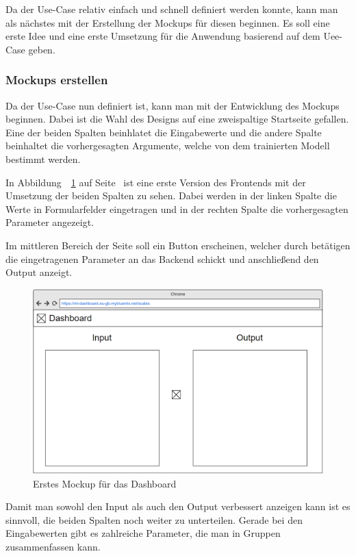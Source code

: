 Da der Use-Case relativ einfach und schnell definiert werden konnte, kann man als nächstes mit der Erstellung der
Mockups für diesen beginnen. Es soll eine erste Idee und eine erste Umsetzung für die Anwendung basierend auf dem
Uee-Case geben.

\subsubsection{Mockups erstellen}
Da der Use-Case nun definiert ist, kann man mit der Entwicklung des Mockups beginnen. Dabei ist die Wahl des
Designs auf eine zweispaltige Startseite gefallen. Eine der beiden Spalten beinhlatet die Eingabewerte und die andere
Spalte beinhaltet die vorhergesagten Argumente, welche von dem trainierten Modell bestimmt werden.

In Abbildung~~\ref{fig:umsetzung_mockup_scale_1} auf Seite~\pageref{fig:umsetzung_mockup_scale_1} ist eine erste Version
des Frontends mit der Umsetzung der beiden Spalten zu sehen. Dabei werden in der linken Spalte die Werte in
Formularfelder eingetragen und in der rechten Spalte die vorhergesagten Parameter angezeigt.

Im mittleren Bereich der Seite soll ein Button erscheinen, welcher durch betätigen die eingetragenen Parameter an das
Backend schickt und anschließend den Output anzeigt.

\begin{figure}[h]
    \centering
    \includegraphics[width=\textwidth]{images/kapitel_4/mockup_scale_1.png}
    \caption{Erstes Mockup für das Dashboard}
    \label{fig:umsetzung_mockup_scale_1}
\end{figure}

Damit man sowohl den Input als auch den Output verbessert anzeigen kann ist es sinnvoll, die beiden Spalten noch weiter
zu unterteilen. Gerade bei den Eingabewerten gibt es zahlreiche Parameter, die man in Gruppen zusammenfassen kann.

